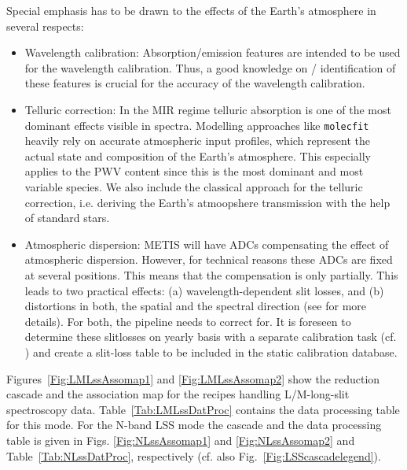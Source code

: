 Special emphasis has to be drawn to the effects of the Earth's
atmosphere in several respects:
\begin{itemize}
\item Wavelength calibration: Absorption/emission features are intended to be
  used for the wavelength calibration. Thus, a good knowledge on /
  identification of these features is crucial for the accuracy of the
  wavelength calibration.
\item Telluric correction: In the MIR regime telluric absorption is
  one of the most dominant effects visible in spectra. Modelling
  approaches like \texttt{molecfit} heavily rely on accurate
  atmospheric input profiles, which represent the actual state and
  composition of the Earth's atmosphere. This especially applies to
  the \ac{PWV} content since this is the most dominant and most variable species. We also include the classical approach for the telluric correction, i.e. deriving the Earth's atmoopshere transmission with the help of standard stars.
\item Atmospheric dispersion: \ac{METIS} will have \ac{ADC}s compensating the
  effect of atmospheric dispersion. However, for technical reasons
  these ADCs are fixed at several positions. This means that the
  compensation is only partially. This leads to two practical effects:
  (a) wavelength-dependent slit losses, and (b) distortions in both,
  the spatial and the spectral direction (see \cite{METIS-ADC_study}
  for more details). For both, the pipeline needs to correct
  for. It is foreseen to determine these slitlosses on yearly basis with a separate calibration task (cf. \cite{METIS-calibration_plan}) and create a slit-loss table to be included in the static calibration database.
\end{itemize}


Figures~\ref{Fig:LMLssAssomap1} and \ref{Fig:LMLssAssomap2} show the reduction cascade and the association map for the recipes handling L/M-long-slit
spectroscopy data.  Table~\ref{Tab:LMLssDatProc} contains the data processing table for this mode. For the N-band \ac{LSS} mode the cascade and the data processing table is given in Figs. \ref{Fig:NLssAssomap1} and \ref{Fig:NLssAssomap2} and Table~\ref{Tab:NLssDatProc}, respectively (cf. also Fig.~\ref{Fig:LSScascadelegend}).

